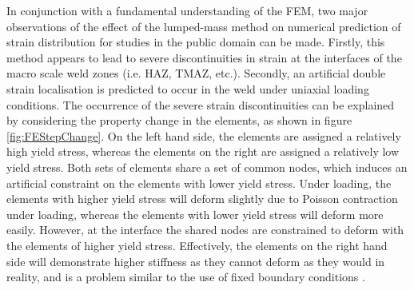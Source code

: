 In conjunction with a fundamental understanding of the FEM, two major observations of the effect of the lumped-mass method on numerical prediction of strain distribution for studies in the public domain can be made. Firstly, this method appears to lead to severe discontinuities in strain at the interfaces of the macro scale weld zones (i.e. HAZ, TMAZ, etc.). Secondly, an artificial double strain localisation is predicted to occur in the weld under uniaxial loading conditions. The occurrence of the severe strain discontinuities can be explained by considering the property change in the elements, as shown in figure \ref{fig:FEStepChange}. On the left hand side, the elements are assigned a relatively high yield stress, whereas the elements on the right are assigned a relatively low yield stress. Both sets of elements share a set of common nodes, which induces an artificial constraint on the elements with lower yield stress. Under loading, the elements with higher yield stress will deform slightly due to Poisson contraction under loading, whereas the elements with lower yield stress will deform more easily. However, at the interface the shared nodes are constrained to deform with the elements of higher yield stress. Effectively, the elements on the right hand side will demonstrate higher stiffness as they cannot deform as they would in reality, and is a problem similar to the use of fixed boundary conditions \cite{Hallquist2006,Systemes2010}. 

